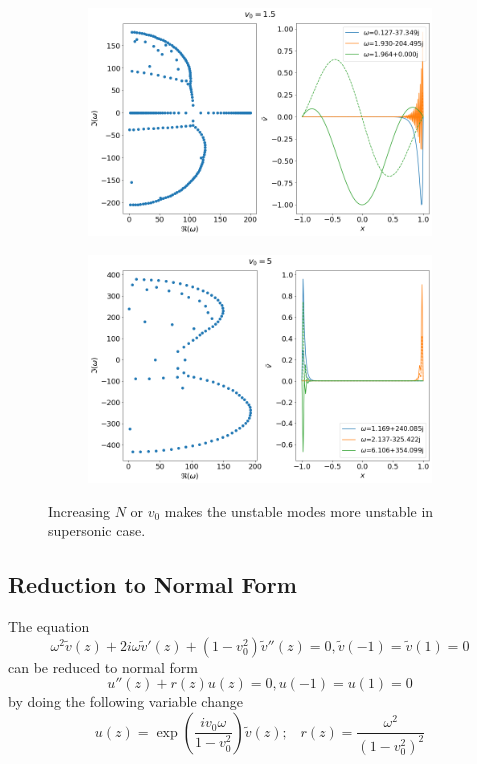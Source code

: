 \documentclass{article}
\begin{document}
\begin{figure}[H]
    \centering
    \begin{subfigure}[b]{0.45\linewidth}
        \includegraphics[width=\linewidth]{img/results-fd-N=201,v0=1.5.png}
        \caption{}
    \end{subfigure}%
    \begin{subfigure}[b]{0.45\linewidth}
        \includegraphics[width=\linewidth]{img/results-fd-N=101,v0=5.png}
        \caption{}
    \end{subfigure}
    \caption{Increasing $N$ or $v_0$ makes the unstable modes more unstable in supersonic case.}
    \label{fig:results-fd-unstable}
\end{figure}

\subsection{Reduction to Normal Form}
The equation 
$$ \omega^2\tilde{v}(z) + 2i\omega\tilde{v}'(z) + (1-v_0^2)\tilde{v}''(z) = 0, \tilde{v}(-1) = \tilde{v}(1) = 0 $$
can be reduced to normal form
$$ u''(z) + r(z)u(z) = 0, u(-1) = u(1) = 0 $$
by doing the following variable change
$$
u(z) = \exp\left(\frac{iv_0\omega}{1-v_0^2}\right)\tilde{v}(z); \;\;\;
r(z) = \frac{\omega^2}{(1-v_0^2)^2}
$$
\end{document}
